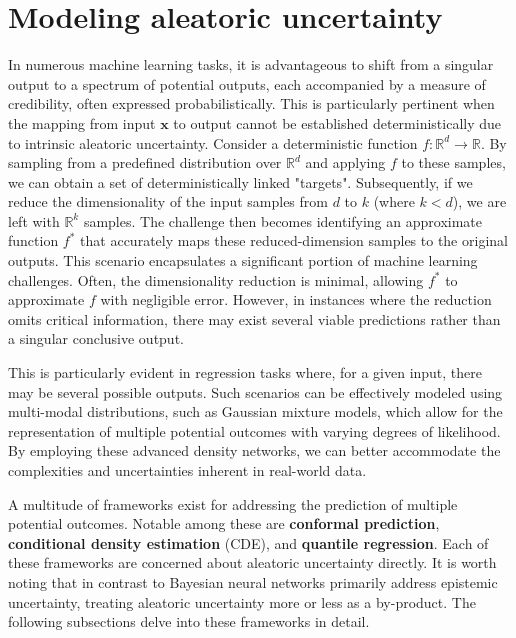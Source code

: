 \documentclass{article}
\begin{document}
\section{Modeling aleatoric uncertainty}

In numerous machine learning tasks, it is advantageous to shift from a singular output to a spectrum of potential outputs, each accompanied by a measure of credibility, often expressed probabilistically. This is particularly pertinent when the mapping from input $\mathbf{x}$ to output cannot be established deterministically due to intrinsic aleatoric uncertainty. Consider a deterministic function $f: \mathbb{R}^d \rightarrow \mathbb{R}$. By sampling from a predefined distribution over $\mathbb{R}^d$ and applying $f$ to these samples, we can obtain a set of deterministically linked "targets". Subsequently, if we reduce the dimensionality of the input samples from $d$ to $k$ (where $k < d$), we are left with $\mathbb{R}^k$ samples. The challenge then becomes identifying an approximate function $f^*$ that accurately maps these reduced-dimension samples to the original outputs. This scenario encapsulates a significant portion of machine learning challenges. Often, the dimensionality reduction is minimal, allowing $f^*$ to approximate $f$ with negligible error. However, in instances where the reduction omits critical information, there may exist several viable predictions rather than a singular conclusive output. 

This is particularly evident in regression tasks where, for a given input, there may be several possible outputs. Such scenarios can be effectively modeled using multi-modal distributions, such as Gaussian mixture models, which allow for the representation of multiple potential outcomes with varying degrees of likelihood. By employing these advanced density networks, we can better accommodate the complexities and uncertainties inherent in real-world data.

A multitude of frameworks exist for addressing the prediction of multiple potential outcomes. Notable among these are \textbf{conformal prediction}, \textbf{conditional density estimation} (CDE), and \textbf{quantile regression}. Each of these frameworks are concerned about aleatoric uncertainty directly. It is worth noting that in contrast to Bayesian neural networks primarily address epistemic uncertainty, treating aleatoric uncertainty more or less as a by-product. The following subsections delve into these frameworks in detail.
\end{document}
